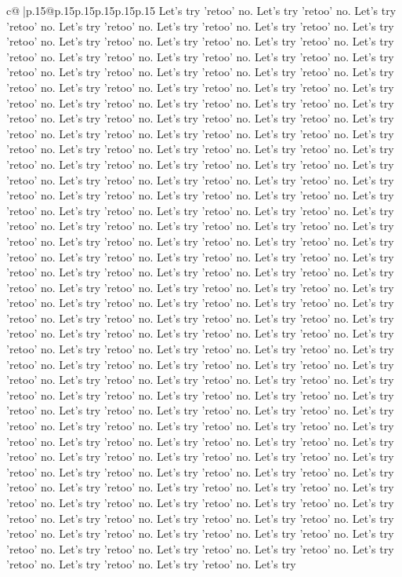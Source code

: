 \documentclass{article}
\begin{document}
{\begin{supertabular}{c@{$\;$}|p{.15\linewidth}@{}p{.15\linewidth}p{.15\linewidth}p{.15\linewidth}p{.15\linewidth}p{.15\linewidth}}
{{{Let's try 'retoo' no. Let's try 'retoo' no. Let's try 'retoo' no. Let's try 'retoo' no. Let's try 'retoo' no. Let's try 'retoo' no. Let's try 'retoo' no. Let's try 'retoo' no. Let's try 'retoo' no. Let's try 'retoo' no. Let's try 'retoo' no. Let's try 'retoo' no. Let's try 'retoo' no. Let's try 'retoo' no. Let's try 'retoo' no. Let's try 'retoo' no. Let's try 'retoo' no. Let's try 'retoo' no. Let's try 'retoo' no. Let's try 'retoo' no. Let's try 'retoo' no. Let's try 'retoo' no. Let's try 'retoo' no. Let's try 'retoo' no. Let's try 'retoo' no. Let's try 'retoo' no. Let's try 'retoo' no. Let's try 'retoo' no. Let's try 'retoo' no. Let's try 'retoo' no. Let's try 'retoo' no. Let's try 'retoo' no. Let's try 'retoo' no. Let's try 'retoo' no. Let's try 'retoo' no. Let's try 'retoo' no. Let's try 'retoo' no. Let's try 'retoo' no. Let's try 'retoo' no. Let's try 'retoo' no. Let's try 'retoo' no. Let's try 'retoo' no. Let's try 'retoo' no. Let's try 'retoo' no. Let's try 'retoo' no. Let's try 'retoo' no. Let's try 'retoo' no. Let's try 'retoo' no. Let's try 'retoo' no. Let's try 'retoo' no. Let's try 'retoo' no. Let's try 'retoo' no. Let's try 'retoo' no. Let's try 'retoo' no. Let's try 'retoo' no. Let's try 'retoo' no. Let's try 'retoo' no. Let's try 'retoo' no. Let's try 'retoo' no. Let's try 'retoo' no. Let's try 'retoo' no. Let's try 'retoo' no. Let's try 'retoo' no. Let's try 'retoo' no. Let's try 'retoo' no. Let's try 'retoo' no. Let's try 'retoo' no. Let's try 'retoo' no. Let's try 'retoo' no. Let's try 'retoo' no. Let's try 'retoo' no. Let's try 'retoo' no. Let's try 'retoo' no. Let's try 'retoo' no. Let's try 'retoo' no. Let's try 'retoo' no. Let's try 'retoo' no. Let's try 'retoo' no. Let's try 'retoo' no. Let's try 'retoo' no. Let's try 'retoo' no. Let's try 'retoo' no. Let's try 'retoo' no. Let's try 'retoo' no. Let's try 'retoo' no. Let's try 'retoo' no. Let's try 'retoo' no. Let's try 'retoo' no. Let's try 'retoo' no. Let's try 'retoo' no. Let's try 'retoo' no. Let's try 'retoo' no. Let's try 'retoo' no. Let's try 'retoo' no. Let's try 'retoo' no. Let's try 'retoo' no. Let's try 'retoo' no. Let's try 'retoo' no. Let's try 'retoo' no. Let's try 'retoo' no. Let's try 'retoo' no. Let's try 'retoo' no. Let's try 'retoo' no. Let's try 'retoo' no. Let's try 'retoo' no. Let's try 'retoo' no. Let's try 'retoo' no. Let's try 'retoo' no. Let's try 'retoo' no. Let's try 'retoo' no. Let's try 'retoo' no. Let's try 'retoo' no. Let's try 'retoo' no. Let's try 'retoo' no. Let's try 'retoo' no. Let's try 'retoo' no. Let's try 'retoo' no. Let's try 'retoo' no. Let's try 'retoo' no. Let's try 'retoo' no. Let's try 'retoo' no. Let's try 'retoo' no. Let's try 'retoo' no. Let's try 'retoo' no. Let's try 'retoo' no. Let's try 'retoo' no. Let's try 'retoo' no. Let's try 'retoo' no. Let's try 'retoo' no. Let's try 'retoo' no. Let's try 'retoo' no. Let's try 'retoo' no. Let's try 'retoo' no. Let's try 'retoo' no. Let's try 'retoo' no. Let's try 'retoo' no. Let's try 'retoo' no. Let's try 'retoo' no. Let's try 'retoo' no. Let's try 'retoo' no. Let's try 'retoo' no. Let's try 'retoo' no. Let's try 'retoo' no. Let's try 'retoo' no. Let's try 'retoo' no. Let's try }}}
\end{supertabular}}
\end{document}
